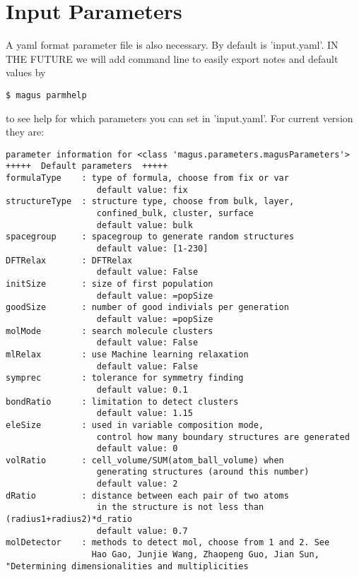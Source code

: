 \documentclass[12pt,oneside]{book}
\begin{document}
\section{Input Parameters}
A yaml format parameter file is also necessary. By default is 'input.yaml'. IN THE FUTURE we will add command line to easily export notes and default values by
\begin{tcolorbox}
    \begin{verbatim}
$ magus parmhelp
    \end{verbatim}
\end{tcolorbox}
to see help for which parameters you can set in 'input.yaml'. For current version they are:
\begin{tcolorbox}
    \begin{verbatim}
parameter information for <class 'magus.parameters.magusParameters'>
+++++  Default parameters  +++++
formulaType    : type of formula, choose from fix or var
                  default value: fix
structureType  : structure type, choose from bulk, layer, 
                  confined_bulk, cluster, surface
                  default value: bulk
spacegroup     : spacegroup to generate random structures
                  default value: [1-230]
DFTRelax       : DFTRelax
                  default value: False
initSize       : size of first population
                  default value: =popSize
goodSize       : number of good indivials per generation
                  default value: =popSize
molMode        : search molecule clusters
                  default value: False
mlRelax        : use Machine learning relaxation
                  default value: False
symprec        : tolerance for symmetry finding
                  default value: 0.1
bondRatio      : limitation to detect clusters
                  default value: 1.15
eleSize        : used in variable composition mode, 
                  control how many boundary structures are generated
                  default value: 0
volRatio       : cell_volume/SUM(atom_ball_volume) when
                  generating structures (around this number)
                  default value: 2
dRatio         : distance between each pair of two atoms
                  in the structure is not less than (radius1+radius2)*d_ratio
                  default value: 0.7
molDetector    : methods to detect mol, choose from 1 and 2. See
                 Hao Gao, Junjie Wang, Zhaopeng Guo, Jian Sun, "Determining dimensionalities and multiplicities

\end{verbatim}
\end{tcolorbox}
\end{document}
